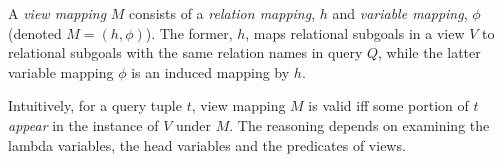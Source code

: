 A \textit{view mapping} $M$ consists of a {\em relation mapping}, $h$ and {\em variable mapping}, $\phi$ (denoted $M=(h, \phi)$). The former, $h$, maps relational subgoals in a view $V$ to relational subgoals with the same relation names in query $Q$, while the latter variable mapping $\phi$ is an induced mapping by $h$. 

Intuitively, for a query tuple $t$, view mapping $M$ is valid iff 
some portion of $t$ {\em appear} in the instance of $V$ under $M$. The reasoning depends on examining the lambda variables, the head variables and the predicates of views.  %

 


